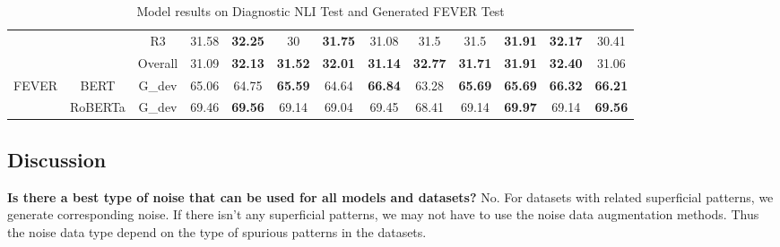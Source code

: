 \begin{table}[]
\begin{tabular}{|c|c|c|c|c|c|c|c|c|c|c|c|c|}
                         &                          & R3                    & 31.58                     & \textbf{32.25}                 & 30             & \textbf{31.75} & 31.08          & 31.5           & 31.5           & \textbf{31.91} & \textbf{32.17} & 30.41          \\ \cline{3-13} 
                         &                          & Overall               & 31.09                     & \textbf{32.13}                 & \textbf{31.52} & \textbf{32.01} & \textbf{31.14} & \textbf{32.77} & \textbf{31.71} & \textbf{31.91} & \textbf{32.40} & 31.06          \\ \hline
\multirow{2}{*}{FEVER}   & BERT                     & G\_dev                & 65.06                     & 64.75                          & \textbf{65.59} & 64.64          & \textbf{66.84} & 63.28          & \textbf{65.69} & \textbf{65.69} & \textbf{66.32} & \textbf{66.21} \\ \cline{2-13} 
                         & RoBERTa                  & G\_dev                & 69.46                     & \textbf{69.56}                 & 69.14          & 69.04          & 69.45          & 68.41          & 69.14          & \textbf{69.97} & 69.14          & \textbf{69.56} \\ \cline{1-13} 
\end{tabular}
	\caption{Model results on Diagnostic NLI Test and Generated FEVER Test}
	\label{tab:snli-fever-stress}
\end{table}

\subsection{Discussion}

\textbf{Is there a best type of noise that can be used for all models and datasets?} 
No. For datasets with related superficial patterns,
we generate corresponding noise. If there isn't any superficial patterns, we 
may not have to use the noise data augmentation methods. 
Thus the noise data 
type depend on the type of spurious patterns in the datasets.

